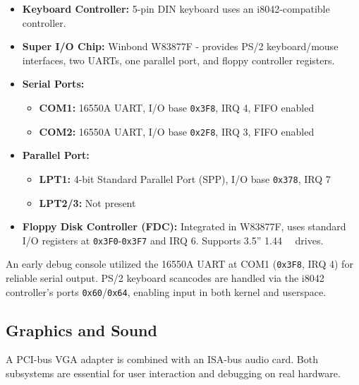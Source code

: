 \documentclass[12pt,a4paper]{report}
\begin{document}
	\begin{itemize}
		\item \textbf{Keyboard Controller:} 5-pin DIN keyboard uses an i8042-compatible controller.
		\item \textbf{Super I/O Chip:} Winbond W83877F - provides PS/2 keyboard/mouse interfaces, two UARTs, one parallel port, and floppy controller registers.
		\item \textbf{Serial Ports:}
		\begin{itemize}
			\item \textbf{COM1:} 16550A UART, I/O base \texttt{0x3F8}, IRQ 4, FIFO enabled
			\item \textbf{COM2:} 16550A UART, I/O base \texttt{0x2F8}, IRQ 3, FIFO enabled
		\end{itemize}
		\item \textbf{Parallel Port:}
		\begin{itemize}
			\item \textbf{LPT1:} 4-bit Standard Parallel Port (SPP), I/O base \texttt{0x378}, IRQ 7
			\item \textbf{LPT2/3:} Not present
		\end{itemize}
		\item \textbf{Floppy Disk Controller (FDC):} Integrated in W83877F, uses standard I/O registers at \texttt{0x3F0}-\texttt{0x3F7} and IRQ 6. Supports 3.5'' \SI{1.44}{\mega\byte} drives.
	\end{itemize}
	
	An early debug console utilized the 16550A UART at COM1 (\texttt{0x3F8}, IRQ 4) for reliable serial output. PS/2 keyboard scancodes are handled via the i8042 controller's ports \texttt{0x60}/\texttt{0x64}, enabling input in both kernel and userspace.
	
	\subsection{Graphics and Sound}
	\label{sec:video-audio}
	
	A PCI-bus VGA adapter is combined with an ISA-bus audio card. Both subsystems are essential for user interaction and debugging on real hardware.
	
\end{document}
